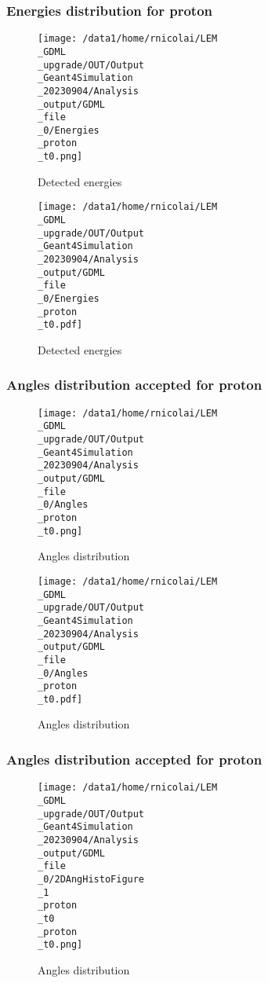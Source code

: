 \documentclass[8pt]{beamer}
\begin{document}
            \begin{frame}
                \frametitle{Energies distribution for proton}
            
        \begin{figure}[h]
            \centering
            \texttt{[image: /data1/home/rnicolai/LEM\\\_GDML\\\_upgrade/OUT/Output\\\_Geant4Simulation\\\_20230904/Analysis\\\_output/GDML\\\_file\\\_0/Energies\\\_proton\\\_t0.png]}
            \caption{Detected energies}
        \end{figure}
        
        \begin{figure}[h]
            \centering
            \texttt{[image: /data1/home/rnicolai/LEM\\\_GDML\\\_upgrade/OUT/Output\\\_Geant4Simulation\\\_20230904/Analysis\\\_output/GDML\\\_file\\\_0/Energies\\\_proton\\\_t0.pdf]}
            \caption{Detected energies}
        \end{figure}
        
            \end{frame}
            
            \begin{frame}
                \frametitle{Angles distribution accepted for proton}
            
        \begin{figure}[h]
            \centering
            \texttt{[image: /data1/home/rnicolai/LEM\\\_GDML\\\_upgrade/OUT/Output\\\_Geant4Simulation\\\_20230904/Analysis\\\_output/GDML\\\_file\\\_0/Angles\\\_proton\\\_t0.png]}
            \caption{Angles distribution}
        \end{figure}
        
        \begin{figure}[h]
            \centering
            \texttt{[image: /data1/home/rnicolai/LEM\\\_GDML\\\_upgrade/OUT/Output\\\_Geant4Simulation\\\_20230904/Analysis\\\_output/GDML\\\_file\\\_0/Angles\\\_proton\\\_t0.pdf]}
            \caption{Angles distribution}
        \end{figure}
        
            \end{frame}
            
            \begin{frame}
                \frametitle{Angles distribution accepted for proton}
            
        \begin{figure}[h]
            \centering
            \texttt{[image: /data1/home/rnicolai/LEM\\\_GDML\\\_upgrade/OUT/Output\\\_Geant4Simulation\\\_20230904/Analysis\\\_output/GDML\\\_file\\\_0/2DAngHistoFigure\\\_1\\\_proton\\\_t0\\\_proton\\\_t0.png]}
            \caption{Angles distribution}
        \end{figure}
        
            \end{frame}
            
\end{document}
